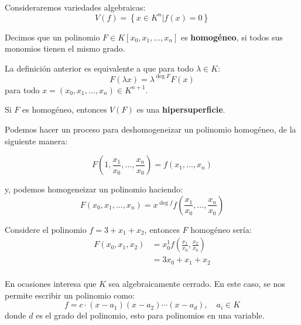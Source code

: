 \documentclass[12pt]{report}
\newcounter{it}
\theoremstyle{largebreak}
\begin{document}
    Consideraremos variedades algebraicas:
    \begin{equation*}
        V(f)=\left\{x\in K^n\Big|f(x)=0 \right\}
    \end{equation*}

    \begin{mydef}
        Decimos que un polinomio $F\in K[x_0,x_1,...,x_n]$ es \textbf{homogéneo}, si todos sus monomios tienen el mismo grado.
    \end{mydef}

    \begin{obs}
        La definición anterior es equivalente a que para todo $\lambda\in K$:
        \begin{equation*}
            F(\lambda x)=\lambda^{\deg F}F(x)
        \end{equation*}
        para todo $x=(x_0,x_1,...,x_n)\in K^{ n+1}$.
    \end{obs}

    \begin{mydef}
        Si $F$ es homogéneo, entonces $V(F)$ es una \textbf{hipersuperficie}.
    \end{mydef}

    Podemos hacer un proceso para deshomogeneizar un polinomio homogéneo, de la siguiente manera:

    \begin{equation*}
        F\left(1,\frac{x_1}{x_0},...,\frac{x_n}{x_0} \right)=f(x_1,...,x_n)
    \end{equation*}

    y, podemos homogeneizar un polinomio haciendo:
    \begin{equation*}
        F(x_0,x_1,...,x_n)=x^{\deg f}f\left(\frac{x_1}{x_0},...,\frac{x_n}{x_0} \right)
    \end{equation*}

    \begin{exa}
        Considere el polinomio $f=3+x_1+x_2$, entonces $F$ homogéneo sería:
        \begin{equation*}
            \begin{split}
                F(x_0,x_1,x_2)&=x_0^1f\left(\frac{x_1}{x_0},\frac{x_2}{x_0}\right)\\
                &=3x_0+x_1+x_2\\
            \end{split}
        \end{equation*}
    \end{exa}

    \begin{obs}
        En ocasiones interesa que $K$ sea algebraicamente cerrado. En este caso, se nos permite escribir un polinomio como:
        \begin{equation*}
            f=c\cdot(x-a_1)(x-a_2)\cdots (x-a_d),\quad a_i\in K
        \end{equation*}
        donde $d$ es el grado del polinomio, esto para polinomios en una variable.
    \end{obs}
\end{document}
